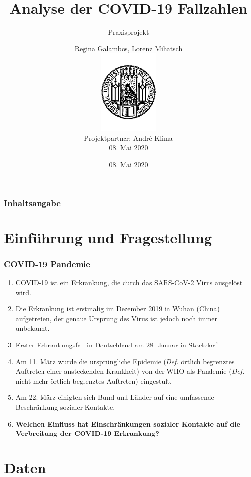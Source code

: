 \documentclass{beamer}
\title[Praxisprojekt: COVID-19]{Analyse der COVID-19 Fallzahlen}
\subtitle{Praxisprojekt}
\date{08. Mai 2020}
\author[R.Galambos, L.Mihatsch]{Regina Galambos, Lorenz Mihatsch\\
	\includegraphics[width=0.22\textwidth]{LMU.pdf}\\
	{\small Projektpartner: Andr\'{e} Klima}\\
	{\small 08. Mai 2020}}
\begin{document}
\begin{frame}
	\titlepage
\end{frame}

\begin{frame}
   \frametitle{Inhaltsangabe}
   \tableofcontents
 \end{frame}
 
 
 \section{Einführung und Fragestellung}
 \begin{frame}
 	\frametitle{COVID-19 Pandemie}
 	\begin{enumerate}
 		\item COVID-19 ist ein Erkrankung, die durch das SARS-CoV-2 Virus ausgelöst wird.
 		\item Die Erkrankung ist erstmalig im Dezember 2019 in Wuhan (China) aufgetreten, der genaue Ursprung des Virus ist jedoch noch immer unbekannt.
 		\item Erster Erkrankungsfall in Deutschland am 28. Januar in Stockdorf.
 		\item Am 11. März wurde die ursprüngliche Epidemie (\emph{Def.} örtlich begrenztes Auftreten einer ansteckenden Krankheit) von der WHO als Pandemie (\emph{Def.} nicht mehr örtlich begrenztes Auftreten) eingestuft.
 		\item Am 22. März einigten sich Bund und Länder auf eine umfassende Beschränkung sozialer Kontakte.
 		\pause
 		\item \textbf{Welchen Einfluss hat Einschränkungen sozialer Kontakte auf die Verbreitung der COVID-19 Erkrankung?}
 	\end{enumerate}
 \end{frame}
 \section{Daten}
  
\end{document}
